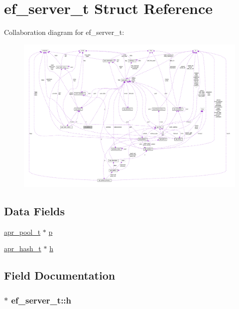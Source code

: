 \hypertarget{structef__server__t}{}\section{ef\+\_\+server\+\_\+t Struct Reference}
\label{structef__server__t}


Collaboration diagram for ef\+\_\+server\+\_\+t\+:
\nopagebreak
\begin{figure}[H]
\begin{center}
\leavevmode
\includegraphics[width=350pt]{structef__server__t__coll__graph}
\end{center}
\end{figure}
\subsection*{Data Fields}
\begin{DoxyCompactItemize}
\item 
\hyperlink{structapr__pool__t}{apr\+\_\+pool\+\_\+t} $\ast$ \hyperlink{structef__server__t_aa41c514610679086e4d24989d8e6c54c}{p}
\item 
\hyperlink{structapr__hash__t}{apr\+\_\+hash\+\_\+t} $\ast$ \hyperlink{structef__server__t_affbad52ca0938836967230bb226dd31f}{h}
\end{DoxyCompactItemize}


\subsection{Field Documentation}
\subsubsection[{\texorpdfstring{h}{h}}]{$\ast$ ef\+\_\+server\+\_\+t\+::h}\hypertarget{structef__server__t_affbad52ca0938836967230bb226dd31f}{}\label{structef__server__t_affbad52ca0938836967230bb226dd31f}
